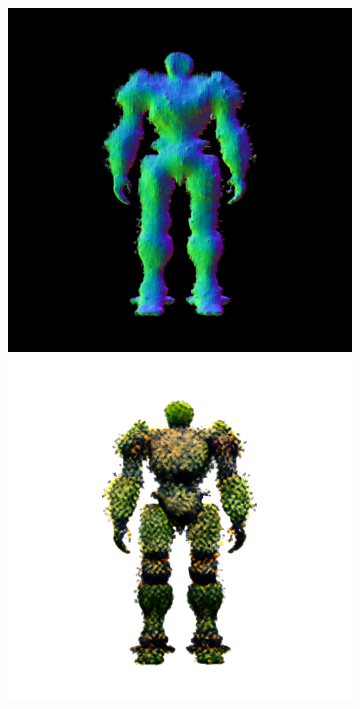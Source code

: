 \begin{figure}[ht]
\begin{subfigure}[b]{0.222\textwidth}
        \includegraphics[width=\textwidth]{figures/appendix/magic123_coarse_robot_back_10000_part2.png}
        \includegraphics[width=\textwidth]{figures/appendix/magic123_coarse_robot_back_10000_part1.png}

\end{subfigure}
\end{figure}
